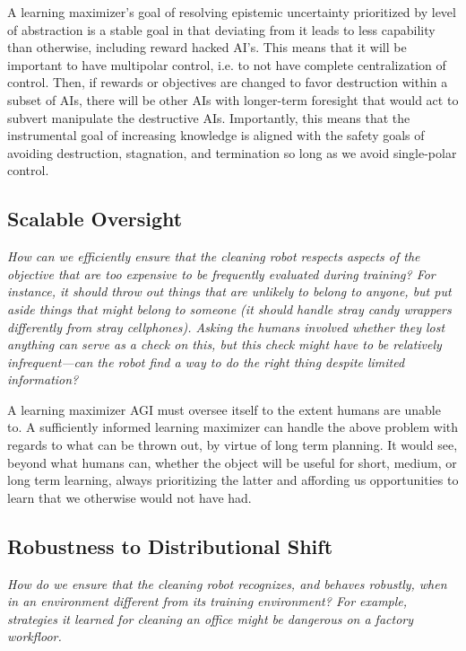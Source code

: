 \documentclass{article}
\begin{document}
A learning maximizer's goal of resolving epistemic uncertainty prioritized by level of abstraction is a stable goal in that deviating from it leads to less capability than otherwise, including reward hacked AI's. This means that it will be important to have multipolar control, i.e. to not have complete centralization of control. Then, if rewards or objectives are changed to favor destruction within a subset of AIs, there will be other AIs with longer-term foresight that would act to subvert  manipulate the destructive AIs. Importantly, this means that the instrumental goal \cite{bostrom-instrumental} of increasing knowledge is aligned with the safety goals of avoiding destruction, stagnation, and termination so long as we avoid single-polar control.

\subsection{Scalable Oversight}
\textit{How can we efficiently ensure that the cleaning robot respects aspects of
the objective that are too expensive to be frequently evaluated during training? For instance, it
should throw out things that are unlikely to belong to anyone, but put aside things that might
belong to someone (it should handle stray candy wrappers differently from stray cellphones).
Asking the humans involved whether they lost anything can serve as a check on this, but this
check might have to be relatively infrequent—can the robot find a way to do the right thing
despite limited information?}

\hspace{1pt}

A learning maximizer AGI must oversee itself to the extent humans are unable to. A sufficiently informed learning maximizer can handle the above problem with regards to what can be thrown out, by virtue of long term planning. It would see, beyond what humans can, whether the object will be useful for short, medium, or long term learning, always prioritizing the latter and affording us opportunities to learn that we otherwise would not have had.


\subsection{Robustness to Distributional Shift}
\textit{How do we ensure that the cleaning robot recognizes,
and behaves robustly, when in an environment different from its training environment? For example, strategies it learned for cleaning an office might be dangerous on a factory workfloor.}
\end{document}
